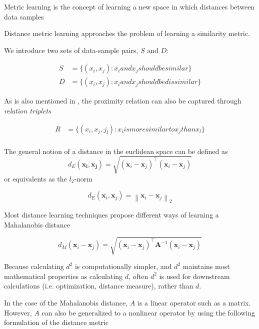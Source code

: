 \documentclass[a4paper,12pt,oneside,openright]{report}
\begin{document}
Metric learning is the concept of learning a new space in which distances between data samples 

Distance metric learning approaches the problem of learning a similarity metric.

We introduce two sets of data-sample pairs, $S$ and $D$:

\begin{align}
S &= \{ (x_i, x_j) : x_i and x_j should be similar\} \\
D &= \{ (x_i, x_j) : x_i and x_j should be dissimilar\}
\end{align}

As is also mentioned in \cite{moutafis17}, the proximity relation can also be captured through \textit{relation triplets}

\begin{align}
R &= \{ (x_i, x_j, j_l) : x_i is more similar to x_j than x_l \} \\
\end{align}

The general notion of a distance in the euclidean space can be defined as 
\begin{equation}
d_{E}\left(\boldsymbol{x}_{\boldsymbol{i}}, \boldsymbol{x}_{\boldsymbol{j}}\right)=\sqrt{\left(\boldsymbol{x}_{i}-\boldsymbol{x}_{j}\right)^{\top}\left(\boldsymbol{x}_{i}-\boldsymbol{x}_{j}\right)}
\end{equation}
or equivalents as the $l_2$-norm

\begin{equation}
d_{E}\left(\boldsymbol{x}_{i}, \boldsymbol{x}_{j}\right)=\left\|\boldsymbol{x}_{i}-\boldsymbol{x}_{j}\right\|_{2}
\end{equation}

Most distance learning techniques propose different ways of learning a Mahalanobis distance \cite{mahalanobis36}

\begin{equation}
d_{M}\left(\boldsymbol{x}_{i}-\boldsymbol{x}_{j}\right)=\sqrt{\left(\boldsymbol{x}_{i}-\boldsymbol{x}_{j}\right)^{\top} \boldsymbol{A}^{-1}\left(\boldsymbol{x}_{i}-\boldsymbol{x}_{j}\right)}
\end{equation}

Because calculating $d^2$ is computationally simpler, and $d^2$ maintains most mathematical properties as calculating $d$, often $d^2$ is used for downstream calculations (i.e. optimization, distance measure), rather than $d$.

In the case of the Mahalanobis distance, $A$ is a linear operator such as a matrix.
However, $A$ can also be generalized to a nonlinear operator by using the following formulation of the distance metric
\end{document}

